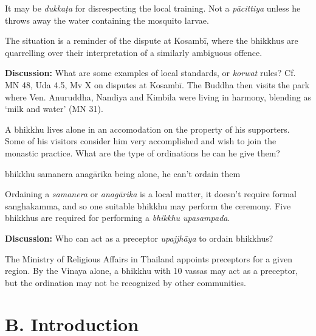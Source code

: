 \begin{exam}{\autoExamName}
\begin{problem}
\begin{solution}
  It may be \emph{dukkaṭa} for disrespecting the local training. Not a \emph{pācittiya}
  unless he throws away the water containing the mosquito larvae.

  The situation is a reminder of the dispute at Kosambī,
  where the bhikkhus are quarrelling over their interpretation of a similarly ambiguous offence.
\end{solution}

\end{problem}

\bigskip

\textbf{Discussion:} What are some examples of local standards, or \emph{korwat}
rules? Cf. MN 48, Uda 4.5, Mv X on disputes at Kosambī. The Buddha then visits
the park where Ven. Anuruddha, Nandiya and Kimbila were living in harmony,
blending as `milk and water' (MN 31).

\problemDivide

\begin{problem}

  A bhikkhu lives alone in an accomodation on the property of his supporters. Some of
  his visitors consider him very accomplished and wish to join the monastic practice.
  What are the type of ordinations he can he give them?

  \bigskip

  \begin{manswers}{4}
    \bChoices
     bhikkhu\eAns
     samanera\eAns
     anagārika\eAns
     being alone, he can't ordain them\eAns
    \eChoices
  \end{manswers}

\begin{solution}
  Ordaining a \emph{samanera} or \emph{anagārika} is a local matter,
  it doesn't require formal sanghakamma, and so one suitable bhikkhu may perform the ceremony.
  Five bhikkhus are required for performing a \emph{bhikkhu upasampada}.
\end{solution}

\bigskip

\textbf{Discussion:} Who can act as a preceptor \emph{upajjhāya} to ordain bhikkhus?

\begin{solution}
  The Ministry of Religious Affairs in Thailand appoints preceptors for a given region.
  By the Vinaya alone, a bhikkhu with 10 vassas may act as a preceptor, but the
  ordination may not be recognized by other communities.
\end{solution}

\end{problem}

\end{exam}

\chapter{B. Introduction}
\renewcommand*{\theChapterTitle}{B. Introduction}
